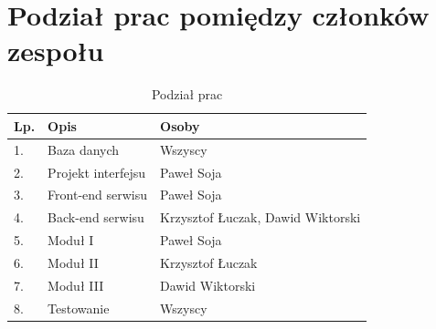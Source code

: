 \documentclass[12pt, titlepage]{article}
\begin{document}
	\section{Podział prac pomiędzy członków zespołu}
	\begin{table}[H]
		\setlength\extrarowheight{5pt}
		\centering
		\caption{Podział prac}
		\label{podzial_prac}
		\begin{tabular}{ | C{2cm} | C{6cm} | C{8cm} | }
			\hline
			\textbf{Lp.} &	\textbf{Opis} &	\textbf{Osoby} \\ \hline
			1.	&	Baza danych			&	Wszyscy \\ \hline
			2.	&	Projekt interfejsu	&	Paweł Soja \\ \hline
			3.	&	Front-end serwisu	&	Paweł Soja \\ \hline
			4.	&	Back-end serwisu	&	Krzysztof Łuczak, Dawid Wiktorski \\ \hline
			5.	&	Moduł I				&	Paweł Soja \\ \hline
			6.	&	Moduł II			&	Krzysztof Łuczak \\ \hline
			7.	&	Moduł III			&	Dawid Wiktorski \\ \hline
			8.	&	Testowanie			&	Wszyscy \\ \hline
		\end{tabular}
	\end{table}
		
\end{document}
